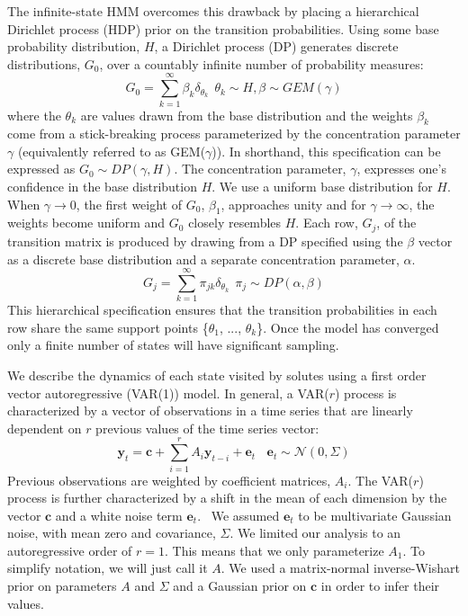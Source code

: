 \documentclass{article}
\begin{document}
  The infinite-state HMM overcomes this drawback by placing a hierarchical
  Dirichlet process (HDP) prior on the transition probabilities. Using some 
  base probability distribution, $H$, a Dirichlet process (DP) generates discrete 
  distributions, $G_0$, over a countably infinite number of probability measures:
  \begin{equation}
      G_0 = \sum_{k=1}^{\infty} \beta_k \delta_{\theta_k} ~~ \theta_k \sim H, \beta \sim GEM(\gamma)
  \end{equation}
  where the $\theta_k$ are values drawn from the base distribution and the weights
  $\beta_k$ come from a stick-breaking process parameterized by the concentration 
  parameter $\gamma$ (equivalently referred to as GEM($\gamma$)). In shorthand, this
  specification can be expressed as $G_0 \sim DP(\gamma, H)$. The concentration 
  parameter, $\gamma$, expresses one's confidence in the base distribution $H$.
  We use a uniform base distribution for $H$. When $\gamma\to 0$, the first 
  weight of $G_0$, $\beta_1$, approaches unity and for $\gamma\to\infty$, the weights
  become uniform and $G_0$ closely resembles $H$. Each row, $G_j$, of the transition 
  matrix is produced by drawing from a DP specified using the $\beta$ vector as a 
  discrete base distribution and a separate concentration parameter, $\alpha$.
  \begin{equation}
      G_j = \sum_{k=1}^{\infty} \pi_{jk} \delta_{\theta_k} ~~ \pi_j \sim DP(\alpha, \beta)
  \end{equation}
  This hierarchical specification ensures that the transition probabilities in 
  each row share the same support points \{$\theta_1$, ..., $\theta_k$\}.
  Once the model has converged only a finite number of states will have significant
  sampling.
  
  We describe the dynamics of each state visited by solutes using a first order vector 
  autoregressive (VAR(1)) model. In general, a VAR($r$) process is characterized by a
  vector of observations in a time series that are linearly dependent on $r$ previous
  values of the time series vector:
  \begin{equation}
  	\mathbf{y}_t = \mathbf{c} + \sum_{i=1}^r A_i\mathbf{y}_{t-i} + \mathbf{e}_t~~~~\mathbf{e}_t \sim \mathcal{N}(0, \Sigma)
  \label{eqn:var}
  \end{equation}
  Previous observations are weighted by coefficient matrices, $A_i$. The VAR($r$) 
  process is further characterized by a shift in the mean of each dimension by the
  vector $\mathbf{c}$ and a white noise term $\mathbf{e}_t$.~\cite{hamilton_time_1994}
  We assumed $\mathbf{e}_t$ to be multivariate Gaussian noise, with mean zero and
  covariance, $\Sigma$. We limited our analysis to an autoregressive order of $r=1$.
  This means that we only parameterize $A_1$. To simplify notation, we will just
  call it $A$. We used a matrix-normal inverse-Wishart prior on parameters $A$ and 
  $\Sigma$ and a Gaussian prior on $\mathbf{c}$ in order to infer their 
  values.~\cite{fox_nonparametric_2009}
  
\end{document}
